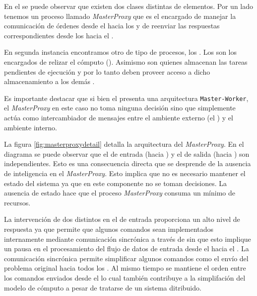 \newcommand{\master}{\emph{MasterProxy}\xspace}

En el \bend se puede observar que existen dos clases distintas de elementos.
Por un lado tenemos un proceso llamado \master que es el encargado de manejar
la comunicación de órdenes desde el \fend hacia los \ws y de reenviar las
respuestas correspondientes desde los \ws hacia el \fend.

En segunda instancia encontramos otro de tipo de procesos, los \ws. Los \ws
son los encargados de relizar el cómputo (\ssolving). Asimismo son quienes
almacenan las tareas pendientes de ejecución y por lo tanto deben proveer
acceso a dicho almacenamiento a los demás \ws.

\newcommand{\masterslave}{\texttt{Master-Worker}\xspace}

Es importante destacar que si bien el \bend presenta una arquitectura
\masterslave, el \master en este caso no toma ninguna decisión sino que
simplemente actúa como intercambiador de mensajes entre el ambiente externo
(el \fend) y el ambiente interno.

La figura \ref{fig:masterproxydetail} detalla la arquitectura del \master. En
el diagrama se puede observar que el \datapath{} de entrada (\fend hacia \bend) y el de salida (\bend hacia
\fend) son independientes. Esto es una consecuencia directa que se desprende
de la ausencia de inteligencia en el \master. Esto implica que no es necesario
mantener el estado del sistema ya que en este componente no se toman
decisiones. La ausencia de estado hace que el proceso \master consuma un
mínimo de recursos.

La intervención de dos \threads distintos en el \datapath de entrada
proporciona un alto nivel de respuesta ya que permite que algunos comandos
sean implementados internamente mediante comunicación sincrónica a través de
\mpi sin que esto implique un pausa en el procesamiento del flujo de datos de
entrada desde el \fend hacia el \bend. La comunicación sincrónica permite
simplificar algunos comandos como el envío del problema original hacia todos
los \ws. Al mismo tiempo se mantiene el orden entre los comandos enviados
desde el \fend lo cual también contribuye a la simplifación del modelo de
cómputo a pesar de tratarse de un sistema ditribuido.

